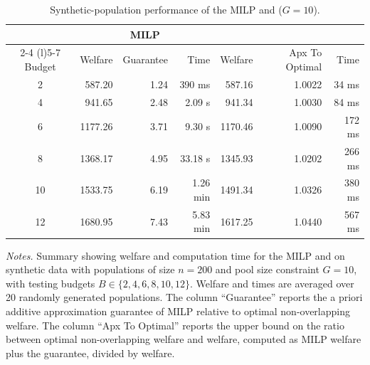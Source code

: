 \begin{table}[tb!]
    \centering
    \begin{threeparttable}
    \caption{Synthetic-population performance of the MILP and \greedy{} ($G=10$).}
    \label{table:experiment4}
    {\small
    \renewcommand{\arraystretch}{1.15}
    \begin{tabular}{@{} crrrrrr @{}}
        \toprule
        & \multicolumn{3}{c}{{MILP}} & \multicolumn{3}{c}{{\greedy{}}} \\
        \cmidrule(lr){2-4} \cmidrule(l){5-7}
        {Budget} & Welfare & Guarantee & Time & Welfare & Apx To Optimal & Time \\
        \midrule
        2 & 587.20 & 1.24 & 390 ms & 587.16 & 1.0022 & 34 ms \\
        4 & 941.65 & 2.48 & 2.09 s & 941.34 & 1.0030 & 84 ms \\
        6 & 1177.26 & 3.71 & 9.30 s & 1170.46 & 1.0090 & 172 ms \\
        8 & 1368.17 & 4.95 & 33.18 s & 1345.93 & 1.0202 & 266 ms \\
        10 & 1533.75 & 6.19 & 1.26 min & 1491.34 & 1.0326 & 380 ms \\
        12 & 1680.95 & 7.43 & 5.83 min & 1617.25 & 1.0440 & 567 ms \\
        \bottomrule
    \end{tabular}
    }
    \begin{tablenotes}[flushleft]
    \footnotesize
    \item[] \emph{Notes.} Summary showing welfare and computation time for the MILP and \greedy{} on synthetic data with populations of size $n=200$ and pool size constraint $G=10$, with testing budgets $B \in \{2, 4, 6, 8, 10, 12\}$. Welfare and times are averaged over 20 randomly generated populations. The column ``Guarantee'' reports the a priori additive approximation guarantee of MILP relative to optimal non-overlapping welfare. The column ``Apx To Optimal'' reports the upper bound on the ratio between optimal non-overlapping welfare and \greedy{} welfare, computed as MILP welfare plus the guarantee, divided by \greedy{} welfare.
    \end{tablenotes}
    \end{threeparttable}
\end{table}
